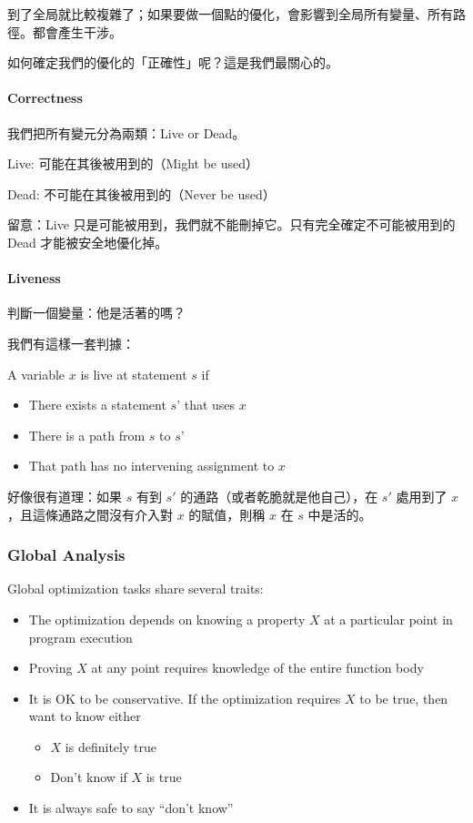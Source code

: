 \documentclass[
]{article}
\begin{document}
到了全局就比較複雜了；如果要做一個點的優化，會影響到全局所有變量、所有路徑。都會產生干涉。

如何確定我們的優化的「正確性」呢？這是我們最關心的。

\hypertarget{header-n23}{%
\paragraph{Correctness}\label{header-n23}}

我們把所有變元分為兩類：Live or Dead。

Live: 可能在其後被用到的（Might be used）

Dead: 不可能在其後被用到的（Never be used）

留意：Live 只是可能被用到，我們就不能刪掉它。只有完全確定不可能被用到的
Dead 才能被安全地優化掉。

\hypertarget{header-n28}{%
\paragraph{Liveness}\label{header-n28}}

判斷一個變量：他是活著的嗎？

我們有這樣一套判據：

A variable \(x\) is live at statement \(s\) if

\begin{itemize}
\item
  There exists a statement \(s’\) that uses \(x\)
\item
  There is a path from \(s\) to \(s’\)
\item
  That path has no intervening assignment to \(x\)
\end{itemize}

好像很有道理：如果 \(s\) 有到 \(s'\) 的通路（或者乾脆就是他自己），在
\(s'\) 處用到了 \(x\)，且這條通路之間沒有介入對 \(x\) 的賦值，則稱 \(x\)
在 \(s\) 中是活的。

\hypertarget{header-n40}{%
\subsubsection{Global Analysis}\label{header-n40}}

Global optimization tasks share several traits:

\begin{itemize}
\item
  The optimization depends on knowing a property \(X\) at a particular
  point in program execution
\item
  Proving \(X\) at any point requires knowledge of the entire function
  body
\item
  It is OK to be conservative. If the optimization requires \(X\) to be
  true, then want to know either

  \begin{itemize}
  \item
    \(X\) is definitely true
  \item
    Don't know if \(X\) is true
  \end{itemize}
\item
  It is always safe to say ``don't know''
\end{itemize}
\end{document}
